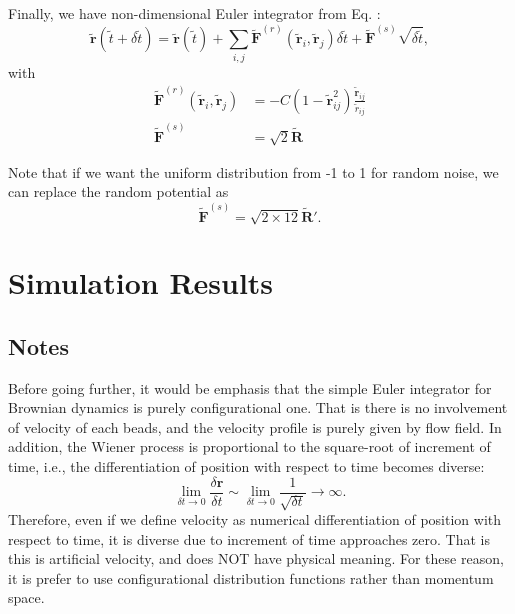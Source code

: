 \documentclass[10pt, a4paper]{report}
\begin{document}
Finally, we have non-dimensional Euler integrator from Eq. \label{eq:update_position}:
\begin{equation}
\tilde{\mathbf{r}}(\tilde{t} + \delta \tilde{t}) = \tilde{\mathbf{r}}(\tilde{t}) + \sum_{i,j}\tilde{\mathbf{F}}^{(r)}(\tilde{\mathbf{r}}_i, \tilde{\mathbf{r}}_j)\delta \tilde{t} + \tilde{\mathbf{F}}^{(s)}\sqrt{\delta\tilde{t}},
\end{equation}
with
\begin{align}
\tilde{\mathbf{F}}^{(r)}(\tilde{\mathbf{r}}_i, \tilde{\mathbf{r}}_j) &= -C\left(1-\tilde{\mathbf{r}}_{ij}^2\right)\frac{\tilde{\mathbf{r}}_{ij}}{\tilde{r}_{ij}}\\
\tilde{\mathbf{F}}^{(s)} &= \sqrt{2}\tilde{\mathbf{R}}
\end{align}

Note that if we want the uniform distribution from -1 to 1 for random noise, we can replace the random potential as
\begin{equation}
\tilde{\mathbf{F}}^{(s)} = \sqrt{2\times 12}\tilde{\mathbf{R}}'.
\end{equation}

\section{Simulation Results}
\subsection{Notes}
Before going further, it would be emphasis that the simple Euler integrator for Brownian dynamics is purely configurational one. That is there is no involvement of velocity of each beads, and the velocity profile is purely given by flow field. In addition, the Wiener process is proportional to the square-root of increment of time, i.e., the differentiation of position with respect to time becomes diverse:
\begin{equation}
\lim_{\delta t\to 0}\frac{\delta \mathbf{r}}{\delta t} \sim \lim_{\delta t\to 0} \frac{1}{\sqrt{\delta t}} \to \infty.
\end{equation}
Therefore, even if we define velocity as numerical differentiation of position with respect to time, it is diverse due to increment of time approaches zero. That is this is artificial velocity, and does NOT have physical meaning.
For these reason, it is prefer to use configurational distribution functions rather than momentum space.
\end{document}

